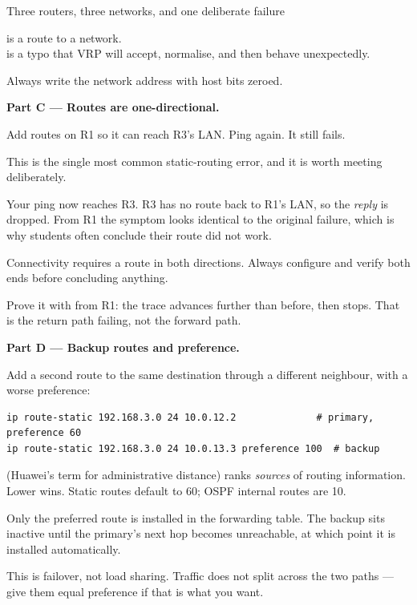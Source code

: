 \begin{labproject}{Three routers, three networks, and one deliberate failure}
\begin{pitfall}
 is a route to a network.\\
 is a typo that VRP will accept, normalise, and then behave unexpectedly.

Always write the network address with host bits zeroed.
\end{pitfall}

\medskip\noindent\textbf{Part C --- Routes are one-directional.}\par
Add routes on R1 so it can reach R3's LAN. Ping again. It still fails.

\begin{keyidea}
This is the single most common static-routing error, and it is worth meeting deliberately.

Your ping now reaches R3. R3 has no route back to R1's LAN, so the \emph{reply} is dropped. From R1 the symptom looks identical to the original failure, which is why students often conclude their route did not work.

Connectivity requires a route in both directions. Always configure and verify both ends before concluding anything.
\end{keyidea}

Prove it with  from R1: the trace advances further than before, then stops. That is the return path failing, not the forward path.

\medskip\noindent\textbf{Part D --- Backup routes and preference.}\par
Add a second route to the same destination through a different neighbour, with a worse preference:

\begin{lstlisting}[style=dcnterminal]
ip route-static 192.168.3.0 24 10.0.12.2              # primary, preference 60
ip route-static 192.168.3.0 24 10.0.13.3 preference 100  # backup
\end{lstlisting}

\begin{keyidea}
 (Huawei's term for administrative distance) ranks \emph{sources} of routing information. Lower wins. Static routes default to 60; OSPF internal routes are 10.

Only the preferred route is installed in the forwarding table. The backup sits inactive until the primary's next hop becomes unreachable, at which point it is installed automatically.

This is failover, not load sharing. Traffic does not split across the two paths --- give them equal preference if that is what you want.
\end{keyidea}


\end{labproject}
